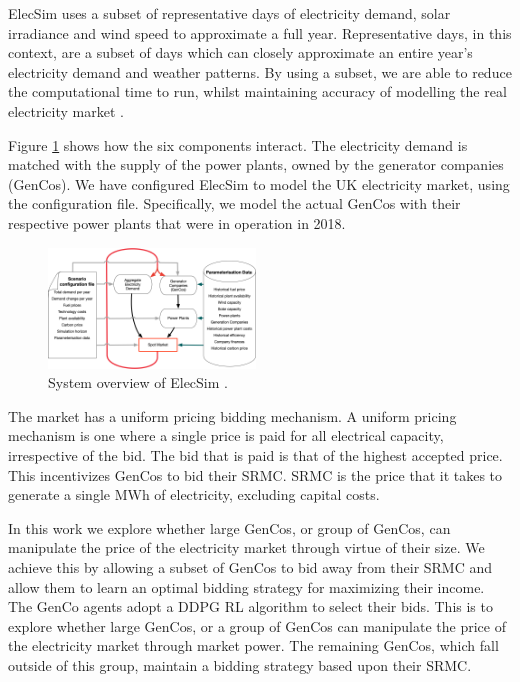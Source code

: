 \documentclass[conference]{IEEEtran}
\begin{document}
ElecSim uses a subset of representative days of electricity demand, solar irradiance and wind speed to approximate a full year. Representative days, in this context, are a subset of days which can closely approximate an entire year's electricity demand and weather patterns. By using a subset, we are able to reduce the computational time to run, whilst maintaining accuracy of modelling the real electricity market \cite{Kell2020}.

Figure \ref{fig:model_details} shows how the six components interact. The electricity demand is matched with the supply of the power plants, owned by the generator companies (GenCos). We have configured ElecSim to model the UK electricity market, using the configuration file. Specifically, we model the actual GenCos with their respective power plants that were in operation in 2018.



\begin{figure}
    \includegraphics[width=0.49\textwidth]{figures/methedology/system-overview-v2}
    \caption{System overview of ElecSim \cite{Kell}.}
    \label{fig:model_details}
\end{figure}

The market has a uniform pricing bidding mechanism. A uniform pricing mechanism is one where a single price is paid for all electrical capacity, irrespective of the bid. The bid that is paid is that of the highest accepted price. This incentivizes GenCos to bid their SRMC. SRMC is the price that it takes to generate a single MWh of electricity, excluding capital costs. 

In this work we explore whether large GenCos, or group of GenCos, can manipulate the price of the electricity market through virtue of their size. We achieve this by allowing a subset of GenCos to bid away from their SRMC and allow them to learn an optimal bidding strategy for maximizing their income. The GenCo agents adopt a DDPG RL algorithm to select their bids. This is to explore whether large GenCos, or a group of GenCos can manipulate the price of the electricity market through market power. The remaining GenCos, which fall outside of this group, maintain a bidding strategy based upon their SRMC.
\end{document}
